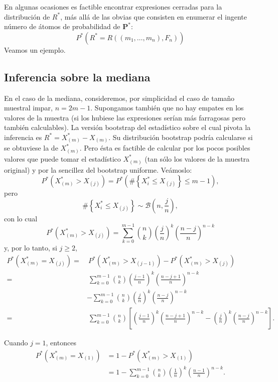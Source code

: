 \documentclass[]{book}
\theoremstyle{definition}
\theoremstyle{definition}
\theoremstyle{definition}
\theoremstyle{remark}
\begin{document}
En algunas ocasiones es factible encontrar expresiones cerradas para la
distribución de \(R^{\ast}\), más allá de las obvias que consisten en
enumerar el ingente número de átomos de probabilidad de
\(\mathbf{P}^{\ast}\):
\[P^{\ast}\left( R^{\ast}=R\left( \left( m_1,\ldots ,m_n \right)
,F_n \right) \right)\] Veamos un ejemplo.

\subsection{Inferencia sobre la
mediana}\label{inferencia-sobre-la-mediana}

En el caso de la mediana, consideremos, por simplicidad el caso de
tamaño muestral impar, \(n=2m-1\). Supongamos también que no hay empates
en los valores de la muestra (si los hubiese las expresiones serían más
farragosas pero también calculables). La versión bootstrap del
estadístico sobre el cual pivota la inferencia es
\(R^{\ast}=X_{\left( m \right)}^{\ast}-X_{(m)}\). Su distribución
bootstrap podría calcularse si se obtuviese la de \(X_{(m)}^{\ast}\).
Pero ésta es factible de calcular por los pocos posibles valores que
puede tomar el estadístico \(X_{(m)}^{\ast}\) (tan sólo los valores de
la muestra original) y por la sencillez del bootstrap uniforme.
Veámoslo: \[P^{\ast}\left( X_{(m)}^{\ast}>X_{(j)} \right)
=P^{\ast}\left( \#\left\{ X_i^{\ast}\leq X_{(j)}\right\}
\leq m-1 \right),\] pero
\[\#\left\{ X_i^{\ast}\leq X_{(j)}\right\} \sim \mathcal{B}\left(
n,\frac{j}{n} \right),\] con lo cual
\[P^{\ast}\left( X_{(m)}^{\ast}>X_{(j)} \right)
=\sum_{k=0}^{m-1}\binom{n}{k}\left( \frac{j}{n} \right)^{k}
\left( \frac{n-j}{n} \right)^{n-k}\] y, por lo tanto, si \(j\geq 2\),
\[\begin{aligned}
P^{\ast}\left( X_{(m)}^{\ast}=X_{(j)} \right)
=&\ P^{\ast}\left( X_{(m)}^{\ast}>X_{\left( j-1 \right)} \right)
-P^{\ast}\left( X_{(m)}^{\ast}>X_{(j)} \right) \\
=&\ \sum_{k=0}^{m-1}\binom{n}{k}\left( \frac{j-1}{n} \right)^{k}\left( \frac{
n-j+1}{n} \right)^{n-k} \\
&-\sum_{k=0}^{m-1}\binom{n}{k}\left( \frac{j}{n} \right)^{k}\left( \frac{n-j}{
n} \right)^{n-k} \\
=&\ \sum_{k=0}^{m-1}\binom{n}{k}\left[ \left( \frac{j-1}{n} \right)^{k}\left( 
\frac{n-j+1}{n} \right)^{n-k}-\left( \frac{j}{n} \right)^{k}\left( \frac{n-j
}{n} \right)^{n-k}\right] .
\end{aligned}\]

Cuando \(j=1\), entonces \[\begin{aligned}
P^{\ast}\left( X_{(m)}^{\ast} = X_{(1)} \right)
&= 1-P^{\ast}\left( X_{(m)}^{\ast}>X_{(1)} \right) \\
&=  1-\sum_{k=0}^{m-1}\binom{n}{k}\left( \frac{1}{n} \right)^{k}
\left( \frac{n-1}{n} \right)^{n-k}.
\end{aligned}\]
\end{document}
